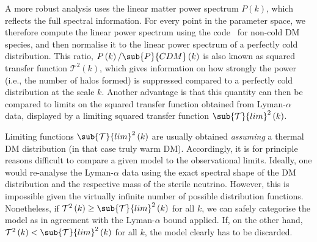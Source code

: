A more robust analysis uses the linear matter power spectrum $P\left(k\right)$, which reflects the full spectral information. For every point in the parameter space, we therefore compute the linear power spectrum using the  code~\cite{Blas:2011rf,Lesgourgues:2011rh} for non-cold DM species, and then normalise it to the linear power spectrum of a perfectly cold distribution. This ratio, $P\left(k\right)/\sub{P}{CDM}\left(k\right)$ is also known as squared transfer function $\mathcal{T}^2\left(k\right)$, which gives information on how strongly the power (i.e., the number of halos formed) is suppressed compared to a perfectly cold distribution at the scale $k$. Another advantage is that this quantity can then be compared to limits on the squared transfer function obtained from Lyman-$\alpha$ data, displayed by a limiting squared transfer function $\sub{\mathcal{T}}{lim}^2\left(k\right)$.

Limiting functions $\sub{\mathcal{T}}{lim}^2\left(k\right)$ are usually obtained \emph{assuming} a thermal DM distribution (in that case truly warm DM). Accordingly, it is for principle reasons difficult to compare a given model to the observational limits. Ideally, one would re-analyse the Lyman-$\alpha$ data using the exact spectral shape of the DM distribution and the respective mass of the sterile neutrino. However, this is impossible given the virtually infinite number of possible distribution functions. Nonetheless, if $\mathcal{T}^2\left(k\right) \geq \sub{\mathcal{T}}{lim}^2\left(k\right)$ for all $k$, we can safely categorise the model as in agreement with the Lyman-$\alpha$ bound applied. If, on the other hand, $\mathcal{T}^2\left(k\right) < \sub{\mathcal{T}}{lim}^2\left(k\right)$ for all $k$, the model clearly has to be discarded.

